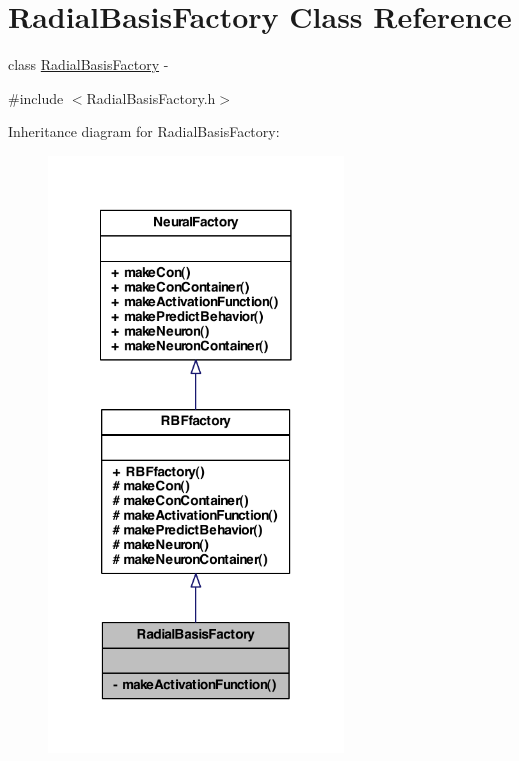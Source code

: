 \hypertarget{class_radial_basis_factory}{
\section{RadialBasisFactory Class Reference}
\label{class_radial_basis_factory}
}


class \hyperlink{class_radial_basis_factory}{RadialBasisFactory} -\/  




{\ttfamily \#include $<$RadialBasisFactory.h$>$}



Inheritance diagram for RadialBasisFactory:
\nopagebreak
\begin{figure}[H]
\begin{center}
\leavevmode
\includegraphics[width=222pt]{class_radial_basis_factory__inherit__graph}
\end{center}
\end{figure}


